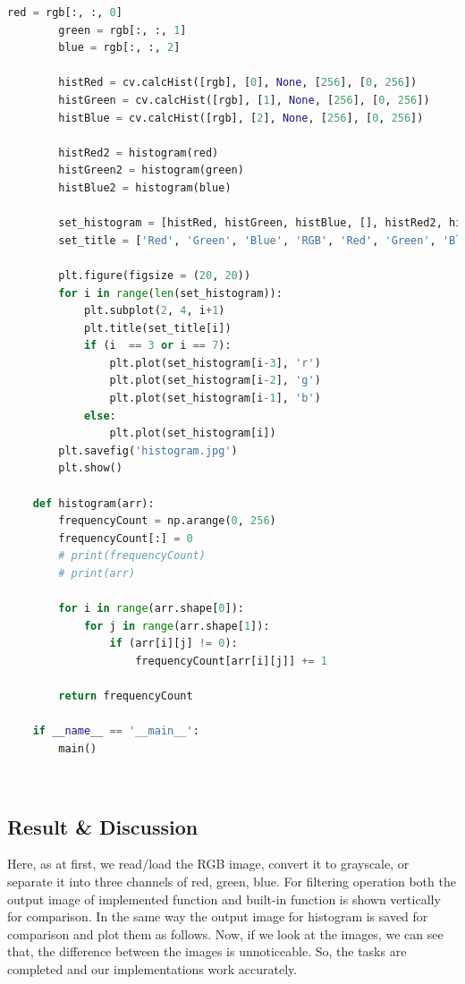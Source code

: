 \documentclass{article}
\begin{document}
{\begin{lstlisting}[language=Python, caption=Code for implementing histogram function and compare it with built-in function]
        red = rgb[:, :, 0]
        green = rgb[:, :, 1]
        blue = rgb[:, :, 2]
    
        histRed = cv.calcHist([rgb], [0], None, [256], [0, 256])
        histGreen = cv.calcHist([rgb], [1], None, [256], [0, 256])
        histBlue = cv.calcHist([rgb], [2], None, [256], [0, 256])
    
        histRed2 = histogram(red)
        histGreen2 = histogram(green)
        histBlue2 = histogram(blue)
    
        set_histogram = [histRed, histGreen, histBlue, [], histRed2, histGreen2, histBlue2, []]
        set_title = ['Red', 'Green', 'Blue', 'RGB', 'Red', 'Green', 'Blue', 'RGB']
        
        plt.figure(figsize = (20, 20))
        for i in range(len(set_histogram)):
            plt.subplot(2, 4, i+1)
            plt.title(set_title[i])
            if (i  == 3 or i == 7):
                plt.plot(set_histogram[i-3], 'r')
                plt.plot(set_histogram[i-2], 'g')
                plt.plot(set_histogram[i-1], 'b')
            else:
                plt.plot(set_histogram[i])
        plt.savefig('histogram.jpg')
        plt.show()
    
    def histogram(arr):
        frequencyCount = np.arange(0, 256)
        frequencyCount[:] = 0
        # print(frequencyCount)
        # print(arr) 
    
        for i in range(arr.shape[0]):
            for j in range(arr.shape[1]):
                if (arr[i][j] != 0):
                    frequencyCount[arr[i][j]] += 1
        
        return frequencyCount     
    
    if __name__ == '__main__':
        main()

    \end{lstlisting}
    \\
    
    \subsection{Result & Discussion}{
        Here, as at first, we read/load the RGB image, convert it to grayscale, or separate it into three channels of red, green, blue. For filtering operation both the output image of implemented function and built-in function is shown vertically for comparison. In the same way the output image for histogram is saved for comparison and plot them as follows. Now, if we look at the images, we can see that, the difference between the images is unnoticeable. So, the tasks are completed and our implementations work accurately.
        
}}
\end{document}
